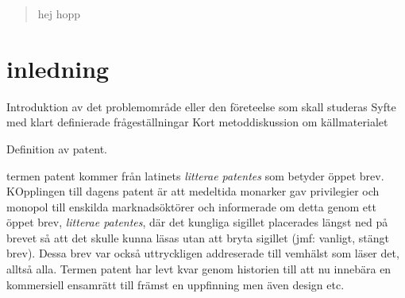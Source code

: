 \begin{abstract}
	hej hopp
\end{abstract}	
	
	
\section{inledning}	
Introduktion av det problemområde eller den företeelse som skall studeras
Syfte med klart definierade frågeställningar
Kort metoddiskussion om källmaterialet

Definition av patent.

termen patent kommer från latinets \emph{litterae patentes} som betyder öppet brev. KOpplingen till dagens patent är att medeltida monarker gav privilegier och monopol till enskilda marknadsöktörer och informerade om detta genom ett öppet brev, \emph{litterae patentes}, där det kungliga sigillet placerades längst ned på brevet så att det skulle kunna läsas utan att bryta sigillet (jmf: vanligt, stängt brev). Dessa brev var också uttryckligen addreserade till vemhälst som läser det, alltså alla. Termen patent har levt kvar genom historien till att nu innebära en kommersiell ensamrätt till främst en uppfinning men även design etc.